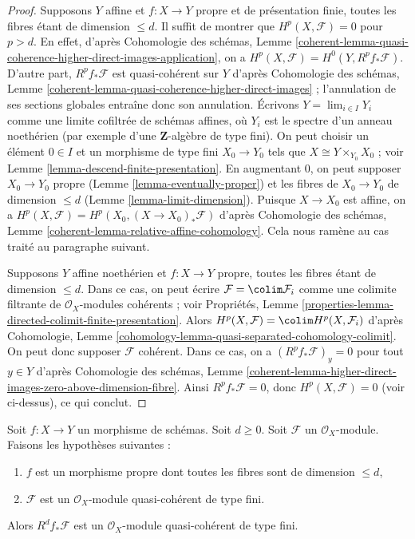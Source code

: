 \begin{proof}
\medskip\noindent
Supposons $Y$ affine et $f : X \to Y$ propre et de présentation finie,
toutes les fibres étant de dimension $\leq d$. Il suffit de montrer que
$H^p(X, \mathcal{F}) = 0$ pour $p > d$. En effet, d'après
Cohomologie des schémas, Lemme
\ref{coherent-lemma-quasi-coherence-higher-direct-images-application},
on a $H^p(X, \mathcal{F}) = H^0(Y, R^pf_*\mathcal{F})$.
D'autre part, $R^pf_*\mathcal{F}$ est quasi-cohérent sur $Y$
d'après Cohomologie des schémas, Lemme
\ref{coherent-lemma-quasi-coherence-higher-direct-images} ;
l'annulation de ses sections globales entraîne donc son annulation.
Écrivons $Y = \lim_{i \in I} Y_i$ comme une limite cofiltrée de schémas affines,
où $Y_i$ est le spectre d'un anneau noethérien
(par exemple d'une $\mathbf{Z}$-algèbre de type fini).
On peut choisir un élément $0 \in I$ et un morphisme de type fini
$X_0 \to Y_0$ tels que $X \cong Y \times_{Y_0} X_0$ ; voir
Lemme \ref{lemma-descend-finite-presentation}.
En augmentant $0$, on peut supposer $X_0 \to Y_0$ propre
(Lemme \ref{lemma-eventually-proper})
et les fibres de $X_0 \to Y_0$ de dimension $\leq d$
(Lemme \ref{lemma-limit-dimension}).
Puisque $X \to X_0$ est affine, on a
$H^p(X, \mathcal{F}) = H^p(X_0, (X \to X_0)_*\mathcal{F})$ d'après
Cohomologie des schémas, Lemme \ref{coherent-lemma-relative-affine-cohomology}.
Cela nous ramène au cas traité au paragraphe suivant.

\medskip\noindent
Supposons $Y$ affine noethérien et $f : X \to Y$ propre,
toutes les fibres étant de dimension $\leq d$.
Dans ce cas, on peut écrire $\mathcal{F} = \colim \mathcal{F}_i$
comme une colimite filtrante de $\mathcal{O}_X$-modules cohérents ; voir
Propriétés, Lemme
\ref{properties-lemma-directed-colimit-finite-presentation}.
Alors $H^p(X, \mathcal{F}) = \colim H^p(X, \mathcal{F}_i)$ d'après
Cohomologie, Lemme \ref{cohomology-lemma-quasi-separated-cohomology-colimit}.
On peut donc supposer $\mathcal{F}$ cohérent.
Dans ce cas, on a $(R^pf_*\mathcal{F})_y = 0$ pour
tout $y \in Y$ d'après Cohomologie des schémas, Lemme
\ref{coherent-lemma-higher-direct-images-zero-above-dimension-fibre}.
Ainsi $R^pf_*\mathcal{F} = 0$, donc
$H^p(X, \mathcal{F}) = 0$ (voir ci-dessus), ce qui conclut.
\end{proof}

\begin{lemma}
\label{lemma-proper-top-cohomology-finite-type}
Soit $f : X \to Y$ un morphisme de schémas. Soit $d \geq 0$. Soit $\mathcal{F}$
un $\mathcal{O}_X$-module. Faisons les hypothèses suivantes :
\begin{enumerate}
\item $f$ est un morphisme propre dont toutes les fibres sont de dimension $\leq d$,
\item $\mathcal{F}$ est un $\mathcal{O}_X$-module quasi-cohérent de type fini.
\end{enumerate}
Alors $R^df_*\mathcal{F}$ est un $\mathcal{O}_X$-module quasi-cohérent
de type fini.
\end{lemma}

